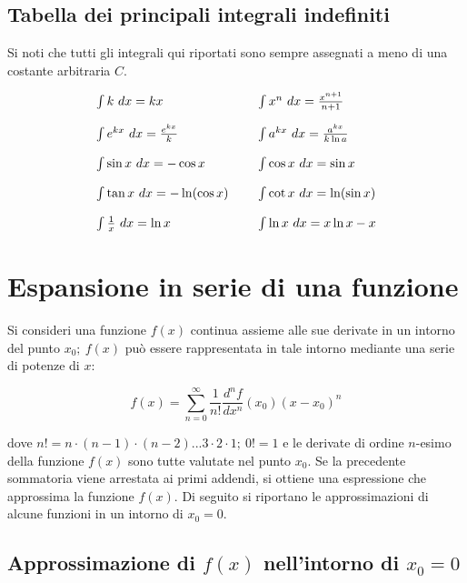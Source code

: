 \subsection*{Tabella dei principali integrali indefiniti}

Si noti che tutti gli integrali qui riportati sono sempre assegnati a meno di una costante arbitraria $\displaystyle C$.

\begin{equation*}
	\begin{array}{ l l }
		\int k\ dx=kx & \int x^n \ dx=\frac{x^{n+1}}{n+1}\\
		[4mm]
		\int e^{kx} \ dx=\frac{e^{kx}}{k} & \int a^{kx} \ dx=\frac{a^{kx}}{k\ln a}\\
		[4mm]
		\int \sin x\ dx=-\cos x & \int \cos x\ dx=\sin x\\
		[4mm]
		\int \tan x\ dx=-\ln(\cos x) \ \ \ \  & \int \cot x\ dx=\ln(\sin x)\\
		[4mm]
		\int \frac{1}{x} \ dx=\ln x & \int \ln x\ dx=x\ln x-x
	\end{array}
\end{equation*}

\section{Espansione in serie di una funzione}

Si consideri una funzione $\displaystyle f( x)$ continua assieme alle sue derivate in un intorno del punto $\displaystyle x_0 ;\ f( x)$ può essere rappresentata in tale intorno mediante una serie di potenze di $\displaystyle x$:

\begin{equation*}
	f( x) =\sum^{\infty }_{n=0}\frac{1}{n!}\frac{d^n f}{dx^n}( x_0)( x-x_0)^n
\end{equation*}

dove $\displaystyle n!=n\cdot ( n-1) \cdot ( n-2) ...3\cdot 2\cdot 1;\ 0!=1$ e le derivate di ordine $\displaystyle n$-esimo della funzione $\displaystyle f( x)$ sono tutte valutate nel punto $\displaystyle x_0$. Se la precedente sommatoria viene arrestata ai primi addendi, si ottiene una espressione che approssima la funzione $\displaystyle f( x)$. Di seguito si riportano le approssimazioni di alcune funzioni in un intorno di $\displaystyle x_0 =0$.

\subsection*{Approssimazione di $\displaystyle f( x)$ nell'intorno di $\displaystyle x_0 =0$}

